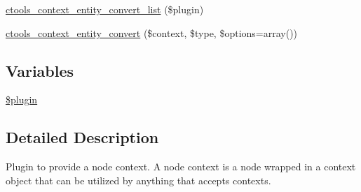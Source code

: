 \begin{DoxyCompactItemize}
\item 
\hyperlink{profiles_2dosomething_2modules_2contrib_2ctools_2plugins_2contexts_2entity_8inc_adddf0221dfebd051d7f9ac67d39ab61b}{ctools\_\-context\_\-entity\_\-convert\_\-list} (\$plugin)
\item 
\hyperlink{profiles_2dosomething_2modules_2contrib_2ctools_2plugins_2contexts_2entity_8inc_a3b833ef59dcfa7155769ee6798c9221c}{ctools\_\-context\_\-entity\_\-convert} (\$context, \$type, \$options=array())
\end{DoxyCompactItemize}
\subsection*{Variables}
\begin{DoxyCompactItemize}
\item 
\hyperlink{profiles_2dosomething_2modules_2contrib_2ctools_2plugins_2contexts_2entity_8inc_ada8a7130088351710bb02ed622d6bf65}{\$plugin}
\end{DoxyCompactItemize}


\subsection{Detailed Description}
Plugin to provide a node context. A node context is a node wrapped in a context object that can be utilized by anything that accepts contexts. 

